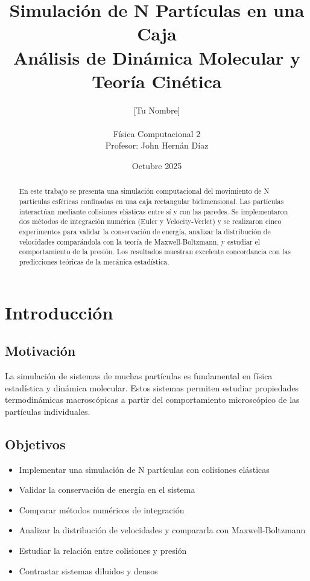 \documentclass[12pt,a4paper]{article}
\title{\textbf{Simulación de N Partículas en una Caja} \\ 
       \large Análisis de Dinámica Molecular y Teoría Cinética}
\author{[Tu Nombre] \\ [Nombre del Compañero] \\
        \small Física Computacional 2 \\
        \small Profesor: John Hernán Díaz}
\date{Octubre 2025}
\begin{document}
\maketitle

\begin{abstract}
En este trabajo se presenta una simulación computacional del movimiento de N partículas esféricas confinadas en una caja rectangular bidimensional. Las partículas interactúan mediante colisiones elásticas entre sí y con las paredes. Se implementaron dos métodos de integración numérica (Euler y Velocity-Verlet) y se realizaron cinco experimentos para validar la conservación de energía, analizar la distribución de velocidades comparándola con la teoría de Maxwell-Boltzmann, y estudiar el comportamiento de la presión. Los resultados muestran excelente concordancia con las predicciones teóricas de la mecánica estadística.
\end{abstract}

\tableofcontents
\newpage

\section{Introducción}

\subsection{Motivación}
La simulación de sistemas de muchas partículas es fundamental en física estadística y dinámica molecular. Estos sistemas permiten estudiar propiedades termodinámicas macroscópicas a partir del comportamiento microscópico de las partículas individuales.

\subsection{Objetivos}
\begin{itemize}
    \item Implementar una simulación de N partículas con colisiones elásticas
    \item Validar la conservación de energía en el sistema
    \item Comparar métodos numéricos de integración
    \item Analizar la distribución de velocidades y compararla con Maxwell-Boltzmann
    \item Estudiar la relación entre colisiones y presión
    \item Contrastar sistemas diluidos y densos
\end{itemize}
\end{document}
